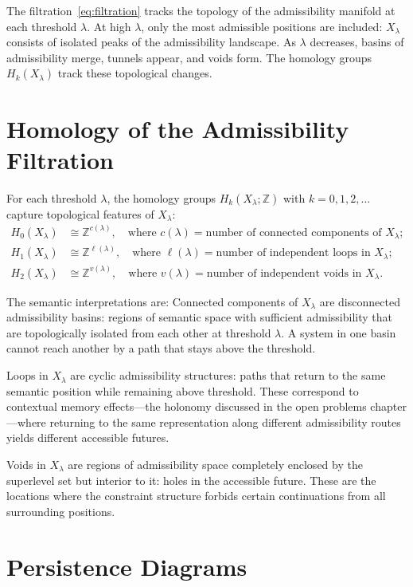 \documentclass[12pt, oneside]{book}
\theoremstyle{plain-flyxion}
\theoremstyle{definition-flyxion}
\begin{document}
The filtration~\eqref{eq:filtration} tracks the topology of the admissibility manifold
at each threshold $\lambda$. At high $\lambda$, only the most admissible positions are
included: $X_\lambda$ consists of isolated peaks of the admissibility landscape. As
$\lambda$ decreases, basins of admissibility merge, tunnels appear, and voids form. The
homology groups $H_k(X_\lambda)$ track these topological changes.

\section{Homology of the Admissibility Filtration}

For each threshold $\lambda$, the homology groups $H_k(X_\lambda; \mathbb{Z})$ with
$k = 0, 1, 2, \ldots$ capture topological features of $X_\lambda$:
\begin{align*}
H_0(X_\lambda) &\cong \mathbb{Z}^{c(\lambda)}, \quad
  \text{where } c(\lambda) = \text{number of connected components of } X_\lambda; \\
H_1(X_\lambda) &\cong \mathbb{Z}^{\ell(\lambda)}, \quad
  \text{where } \ell(\lambda) = \text{number of independent loops in } X_\lambda; \\
H_2(X_\lambda) &\cong \mathbb{Z}^{v(\lambda)}, \quad
  \text{where } v(\lambda) = \text{number of independent voids in } X_\lambda.
\end{align*}

The semantic interpretations are:
Connected components of $X_\lambda$ are disconnected admissibility basins: regions of
semantic space with sufficient admissibility that are topologically isolated from each
other at threshold $\lambda$. A system in one basin cannot reach another by a path that
stays above the threshold.

Loops in $X_\lambda$ are cyclic admissibility structures: paths that return to the same
semantic position while remaining above threshold. These correspond to contextual memory
effects---the holonomy discussed in the open problems chapter---where returning to the
same representation along different admissibility routes yields different accessible
futures.

Voids in $X_\lambda$ are regions of admissibility space completely enclosed by the
superlevel set but interior to it: holes in the accessible future. These are the
locations where the constraint structure forbids certain continuations from all
surrounding positions.

\section{Persistence Diagrams}
\end{document}
